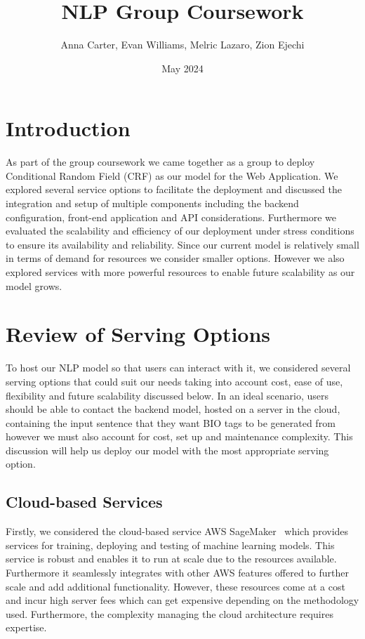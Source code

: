 \documentclass{surreydissertation}
\title{NLP Group Coursework}
\author{Anna Carter, Evan Williams, Melric Lazaro, Zion Ejechi}
\date{May 2024}
\begin{document}
\maketitle

\tableofcontents
\newpage

\section{Introduction}
As part of the group coursework we came together as a group to deploy Conditional Random Field (CRF) as our model for the Web Application. We explored several service options to facilitate the deployment and discussed the integration and setup of multiple components including the backend configuration, front-end application and API considerations. Furthermore we evaluated the scalability and efficiency of our deployment under stress conditions to ensure its availability and reliability. Since our current model is relatively small in terms of demand for resources we consider smaller options. However we also explored services with more powerful resources to enable future scalability as our model grows. 

\section{Review of Serving Options}
To host our NLP model so that users can interact with it, we considered several serving options that could suit our needs taking into account cost, ease of use, flexibility and future scalability discussed below. In an ideal scenario, users should be able to contact the backend model, hosted on a server in the cloud, containing the input sentence that they want BIO tags to be generated from however we must also account for cost, set up and maintenance complexity. This discussion will help us deploy our model with the most appropriate serving option.


\subsection{Cloud-based Services}
Firstly, we considered the cloud-based service AWS SageMaker~\cite{AWSSageMaker} which provides services for training, deploying and testing of machine learning models. This service is robust and enables it to run at scale due to the resources available. Furthermore it seamlessly integrates with other AWS features offered to further scale and add additional functionality. However, these resources come at a cost and incur high server fees which can get expensive depending on the methodology used. Furthermore, the complexity managing the cloud architecture requires expertise.
\end{document}
